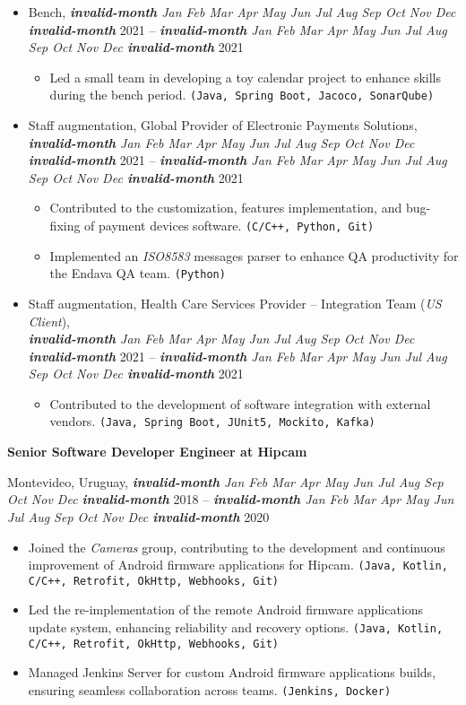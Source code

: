 \documentclass[a4paper]{article}
\newcommand{\invalidmonth}{\emph{\textbf{invalid-month}}}
\newcommand{\cvmonth}[1]{
  \ifcase#1 \invalidmonth
    \or Jan
    \or Feb
    \or Mar
    \or Apr
    \or May
    \or Jun
    \or Jul
    \or Aug
    \or Sep
    \or Oct
    \or Nov
    \or Dec
  \else
    \invalidmonth
  \fi
}
\newcommand{\cvdate}[2]{
  \emph{\cvmonth{#1}} {#2}
}
\newcommand{\cvposition}[2]{
  \noindent\textbf{#1 at #2}\par
}
\newcommand{\cvlocation}[3]{
  \noindent #1, #2 -- #3\par
}
\newenvironment{cvexperience}{
  \noindent{\large\textbf{Work Experience:}}
  \medskip
}{
  \bigskip
}
\newenvironment{cvjob}{
  \begin{sloppypar}
}{
  \end{sloppypar}
  \bigskip
}
\newcommand{\cvskills}[1]{\texttt{(#1)}}
\begin{document}
\begin{cvexperience}
\begin{cvjob}
\begin{itemize}
  \item Bench, \cvdate{1}{2021}--\cvdate{2}{2021}
  \begin{itemize}
    \item Led a small team in developing a toy calendar project to enhance skills during the bench period. 
    \cvskills{Java, Spring Boot, Jacoco, SonarQube}
  \end{itemize}
  \item Staff augmentation, Global Provider of Electronic Payments Solutions, \cvdate{3}{2021}--\cvdate{6}{2021}
  \begin{itemize}
    \item Contributed to the customization, features implementation, and bug-fixing of payment devices software. 
    \cvskills{C/C++, Python, Git}
    \item Implemented an \emph{ISO8583} messages parser to enhance QA productivity for the Endava QA team. \cvskills{Python}
  \end{itemize}
  \item Staff augmentation, Health Care Services Provider -- Integration Team (\emph{US Client}),\\\cvdate{6}{2021}--\cvdate{10}{2021}
  \begin{itemize}
    \item Contributed to the development of software integration with external vendors. 
    \cvskills{Java, Spring Boot, JUnit5, Mockito, Kafka}
  \end{itemize}
\end{itemize}
\end{cvjob}

\begin{cvjob}
  \cvposition{Senior Software Developer Engineer}{Hipcam}
  \cvlocation{Montevideo, Uruguay}{\cvdate{11}{2018}}{\cvdate{10}{2020}}
  \begin{itemize}
    \item Joined the \emph{Cameras} group, contributing to the development and continuous improvement of Android firmware
    applications for Hipcam. \cvskills{Java, Kotlin, C/C++, Retrofit, OkHttp, Webhooks, Git}
    \item Led the re-implementation of the remote Android firmware applications update system, enhancing reliability and recovery options. 
    \cvskills{Java, Kotlin, C/C++, Retrofit, OkHttp, Webhooks, Git}
    \item Managed Jenkins Server for custom Android firmware applications builds, ensuring seamless collaboration across teams. 
    \cvskills{Jenkins, Docker}
  \end{itemize}
\end{cvjob}


\end{cvexperience}
\end{document}
